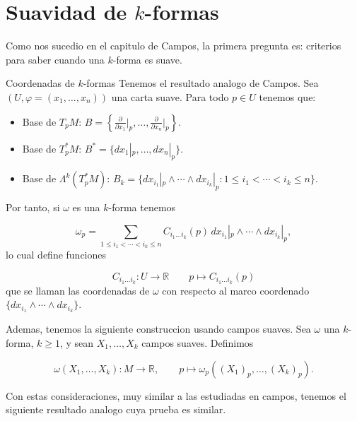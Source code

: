 \section{Suavidad de $k$-formas}
\begin{bookremark}{}
Como nos sucedio en el capitulo de Campos, la primera pregunta es: criterios para saber cuando una $k$-forma es suave.

\end{bookremark}
\begin{bookproposition}{Coordenadas de $k$-formas}
Tenemos el resultado analogo de Campos. Sea $(U,\varphi=(x_1,\ldots,x_n))$ una carta suave. Para todo $p\in U$ tenemos que:

\begin{itemize}
\item Base de $T_pM$: $B=\left\{\frac{\partial}{\partial x_1}\big|_p,\ldots,\frac{\partial}{\partial x_n}\big|_p\right\}$.
\item Base de $T_p^*M$: $B^*=\{dx_1|_p,\ldots,dx_n|_p\}$.
\item Base de $\Lambda^k(T_p^*M)$: $B_k=\{dx_{i_1}|_p\wedge\cdots\wedge dx_{i_k}|_p:1\le i_1<\cdots<i_k\le n\}$.
\end{itemize}
Por tanto, si $\omega$ es una $k$-forma tenemos

\[
\omega_p=\sum_{1\le i_1<\cdots<i_k\le n}C_{i_1\ldots i_k}(p)\,dx_{i_1}|_p\wedge\cdots\wedge dx_{i_k}|_p,
\]
lo cual define funciones

\[
C_{i_1\ldots i_k}:U\to\mathbb R \qquad p\mapsto C_{i_1\ldots i_k}(p)
\]
que se llaman las coordenadas de $\omega$ con respecto al marco coordenado $\{dx_{i_1}\wedge\cdots\wedge dx_{i_k}\}$.

\end{bookproposition}
\label{blk:70585b}
\begin{bookremark}{}
Ademas, tenemos la siguiente construccion usando campos suaves. Sea $\omega$ una $k$-forma, $k\ge1$, y sean $X_1,\ldots,X_k$ campos suaves. Definimos

\[
\omega(X_1,\ldots,X_k):M\to\mathbb R,\qquad p\mapsto\omega_p((X_1)_p,\ldots,(X_k)_p).
\]
\end{bookremark}
\begin{bookremark}{}
Con estas consideraciones, muy similar a las estudiadas en campos, tenemos el siguiente resultado analogo cuya prueba es similar.

\end{bookremark}
